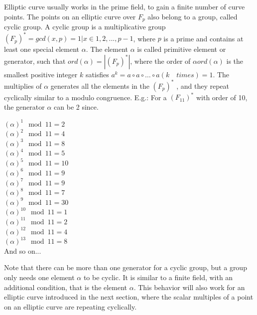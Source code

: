 Elliptic curve usually works in the prime field, to gain a finite number of curve points. The points on an elliptic curve over $F_p$ also belong to a group, called cyclic group. A cyclic group is a multiplicative group $(F_p)^* = {gcd(x,p) = 1 | x \in {1, 2, ..., p-1}}$, where $p$ is a prime and contains at least one special element $\alpha$. The element $\alpha$ is called primitive element or generator, such that $ord(\alpha) = |(F_p)^*|$, where the order of $\alpha ord(\alpha)$ is the smallest positive integer $k$ satisfies $a^k = a \circ a \circ … \circ a (k \quad times) = 1$. The multiplies of $\alpha$ generates all the elements in the $(F_p)^*$ , and they repeat cyclically similar to a modulo congruence. E.g.: For a $(F_11)^*$ with order of 10, the generator $\alpha$ can be 2 since.\\

\setlength{\columnsep}{5cm} 
\begin{multicols}{2}
$(\alpha)^1 \mod 11 = 2$\\
$(\alpha)^2 \mod 11 = 4$\\
$(\alpha)^3 \mod 11 = 8$\\
$(\alpha)^4 \mod 11 = 5$\\
$(\alpha)^5 \mod 11 = 10$\\
$(\alpha)^6 \mod 11 = 9$\\
$(\alpha)^7 \mod 11 = 9$\\
$(\alpha)^8 \mod 11 = 7$\\
$(\alpha)^9 \mod 11 = 30$\\
$(\alpha)^10 \mod 11 = 1$\\
$(\alpha)^11 \mod 11 = 2$\\
$(\alpha)^12 \mod 11 = 4$\\
$(\alpha)^13 \mod 11 = 8$\\
And so on...\\
\end{multicols}


Note that there can be more than one generator for a cyclic group, but a group only needs one element $\alpha$ to be cyclic. It is similar to a finite field, with an additional condition, that is the element $\alpha$. This behavior will also work for an elliptic curve introduced in the next section, where the scalar multiples of a point on an elliptic curve are repeating cyclically.\\

